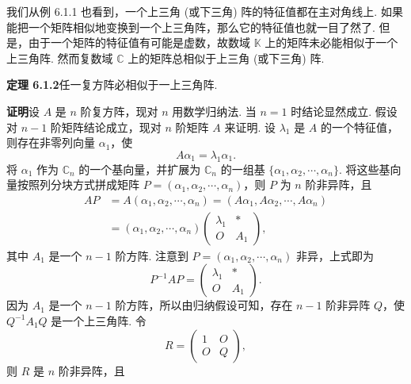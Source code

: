 \documentclass[UTF8,12pt,a4paper,fontset=fandol]{ctexart}
\begin{document}
我们从例 6.1.1 也看到，一个上三角 (或下三角) 阵的特征值都在主对角线上. 如果能把一个矩阵相似地变换到一个上三角阵，那么它的特征值也就一目了然了. 但是，由于一个矩阵的特征值有可能是虚数，故数域 $\mathbb{K}$ 上的矩阵未必能相似于一个上三角阵. 然而复数域 $\mathbb{C}$ 上的矩阵总相似于上三角 (或下三角) 阵.

\noindent\textbf{定理 6.1.2}\quad 任一复方阵必相似于一上三角阵.

\noindent\textbf{证明}\quad 设 $A$ 是 $n$ 阶复方阵，现对 $n$ 用数学归纳法. 当 $n=1$ 时结论显然成立. 假设对 $n-1$ 阶矩阵结论成立，现对 $n$ 阶矩阵 $A$ 来证明. 设 $\lambda_1$ 是 $A$ 的一个特征值，则存在非零列向量 $\alpha_1$，使
\[
A\alpha_1=\lambda_1\alpha_1.
\]
将 $\alpha_1$ 作为 $\mathbb{C}_n$ 的一个基向量，并扩展为 $\mathbb{C}_n$ 的一组基 $\{\alpha_1,\alpha_2,\cdots,\alpha_n\}$. 将这些基向量按照列分块方式拼成矩阵 $P=(\alpha_1,\alpha_2,\cdots,\alpha_n)$，则 $P$ 为 $n$ 阶非异阵，且
\[
\begin{aligned}
AP&=A(\alpha_1,\alpha_2,\cdots,\alpha_n)=(A\alpha_1,A\alpha_2,\cdots,A\alpha_n)\\
&=(\alpha_1,\alpha_2,\cdots,\alpha_n)
\left(\begin{array}{cc}
\lambda_1 & *\\
O & A_1
\end{array}\right),
\end{aligned}
\]
其中 $A_1$ 是一个 $n-1$ 阶方阵. 注意到 $P=(\alpha_1,\alpha_2,\cdots,\alpha_n)$ 非异，上式即为
\[
P^{-1}AP=\left(\begin{array}{cc}
\lambda_1 & *\\
O & A_1
\end{array}\right).
\]
因为 $A_1$ 是一个 $n-1$ 阶方阵，所以由归纳假设可知，存在 $n-1$ 阶非异阵 $Q$，使 $Q^{-1}A_1Q$ 是一个上三角阵. 令
\[
R=\left(\begin{array}{cc}
1 & O\\
O & Q
\end{array}\right),
\]
则 $R$ 是 $n$ 阶非异阵，且
\end{document}
